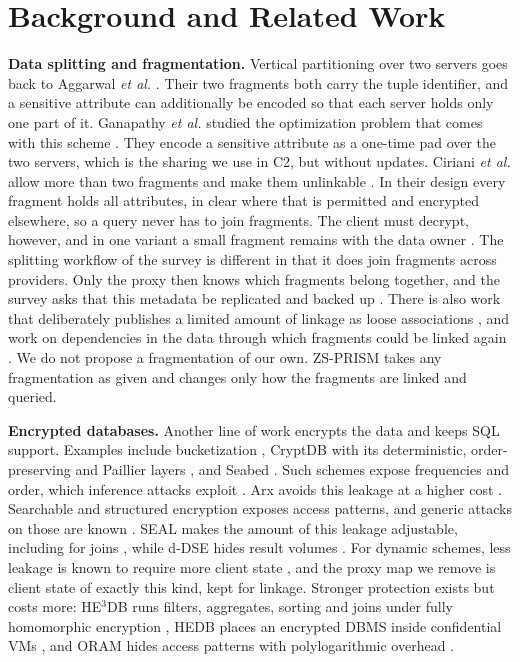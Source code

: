 \documentclass[conference]{IEEEtran}
\newcommand{\sys}{ZS-PRISM}
\begin{document}
\section{Background and Related Work}\label{sec:related}

\textbf{Data splitting and fragmentation.}
Vertical partitioning over two servers goes back to Aggarwal \emph{et al.} \cite{aggarwal2005two}. Their two fragments both carry the tuple identifier, and a sensitive attribute can additionally be encoded so that each server holds only one part of it. Ganapathy \emph{et al.} studied the optimization problem that comes with this scheme \cite{ganapathy2012distributing}. They encode a sensitive attribute as a one-time pad over the two servers, which is the sharing we use in C2, but without updates. Ciriani \emph{et al.} allow more than two fragments and make them unlinkable \cite{ciriani2010combining}. In their design every fragment holds all attributes, in clear where that is permitted and encrypted elsewhere, so a query never has to join fragments. The client must decrypt, however, and in one variant a small fragment remains with the data owner \cite{ciriani2009keep}. The splitting workflow of the survey is different in that it does join fragments across providers. Only the proxy then knows which fragments belong together, and the survey asks that this metadata be replicated and backed up \cite[Sec.~3.1.1]{domingo2019survey}. There is also work that deliberately publishes a limited amount of linkage as loose associations \cite{decapitani2010loose}, and work on dependencies in the data through which fragments could be linked again \cite{decapitani2014dependencies}. We do not propose a fragmentation of our own. \sys{} takes any fragmentation as given and changes only how the fragments are linked and queried.

\textbf{Encrypted databases.}
Another line of work encrypts the data and keeps SQL support. Examples include bucketization \cite{hacigumus2002executing}, CryptDB with its deterministic, order-preserving and Paillier layers \cite{popa2011cryptdb,bellare2007det,paillier1999}, and Seabed \cite{papadimitriou2016seabed}. Such schemes expose frequencies and order, which inference attacks exploit \cite{naveed2015inference}. Arx avoids this leakage at a higher cost \cite{poddar2019arx}. Searchable and structured encryption \cite{kamara2018sql} exposes access patterns, and generic attacks on those are known \cite{kellaris2016generic}. SEAL makes the amount of this leakage adjustable, including for joins \cite{demertzis2020seal}, while d-DSE hides result volumes \cite{liu2024ddse}. For dynamic schemes, less leakage is known to require more client state \cite{demertzis2020small}, and the proxy map we remove is client state of exactly this kind, kept for linkage. Stronger protection exists but costs more: HE$^3$DB runs filters, aggregates, sorting and joins under fully homomorphic encryption \cite{bian2023he3db}, HEDB places an encrypted DBMS inside confidential VMs \cite{li2023hedb}, and ORAM hides access patterns with polylogarithmic overhead \cite{stefanov2013path}.
\end{document}
